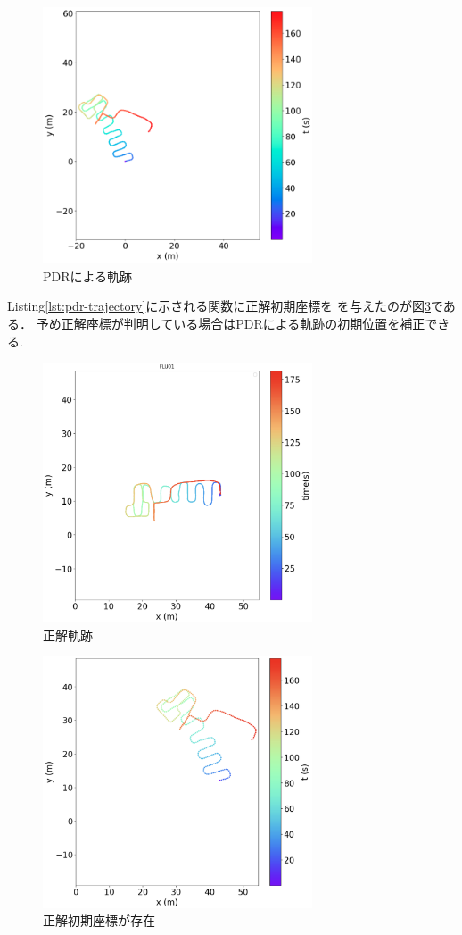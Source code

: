 \begin{figure}[h]
	\centering
	\includegraphics[width=80mm]{image/pdr.jpg}
	\caption{PDRによる軌跡}    \label{fig:pdr}
\end{figure}

Listing\ref{lst:pdr-trajectory}に示される関数に正解初期座標を
を与えたのが図\ref{fig:pdr-move}である．
予め正解座標が判明している場合はPDRによる軌跡の初期位置を補正できる.

\begin{figure}[h]
	\centering
	\includegraphics[width=80mm]{image/gt2.jpg}
	\caption{正解軌跡}    \label{fig:gt-trajectory}
\end{figure}

\begin{figure}[h]
	\centering
	\includegraphics[width=80mm]{image/pdr-move.jpg}
	\caption{正解初期座標が存在}    \label{fig:pdr-move}
\end{figure}


